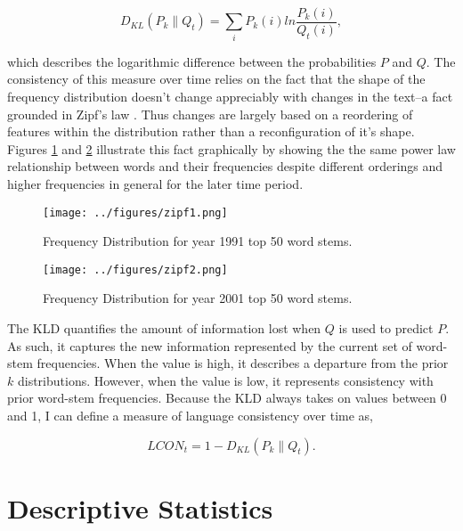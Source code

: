 \begin{equation}
	D_{KL}(P_k\|Q_t) = \sum_i{P_k(i)ln\frac{P_k(i)}{Q_t(i)}},
\end{equation}

\noindent which describes the logarithmic difference between the probabilities $P$ and $Q$. The consistency of this measure over time relies on the fact that the shape of the frequency distribution doesn't change appreciably with changes in the text--a fact grounded in Zipf's law \citep{zipf1932, adamic2002}. Thus changes are largely based on a reordering of features within the distribution rather than a reconfiguration of it's shape. Figures \ref{zipf1} and \ref{zipf2} illustrate this fact graphically by showing the the same power law relationship between words and their frequencies despite different orderings and higher frequencies in general for the later time period.

\begin{figure}
\begin{center}
\texttt{[image: ../figures/zipf1.png]}
\caption[Frequency Distribution 1991]{Frequency Distribution for year 1991 top 50 word stems. \label{zipf1}}
\end{center}
\end{figure}

\begin{figure}
\begin{center}
\texttt{[image: ../figures/zipf2.png]}
\caption[Frequency Distribution 2001]{Frequency Distribution for year 2001 top 50 word stems. \label{zipf2}}
\end{center}
\end{figure}

The KLD quantifies the amount of information lost when $Q$ is used to predict $P$. As such, it captures the new information represented by the current set of word-stem frequencies. When the value is high, it describes a departure from the prior $k$ distributions. However, when the value is low, it represents consistency with prior word-stem frequencies. Because the KLD always takes on values between 0 and 1, I can define a measure of language consistency over time as,

\begin{equation}
	LCON_t=1-D_{KL}(P_k\|Q_t).
\end{equation}


\section{Descriptive Statistics}

